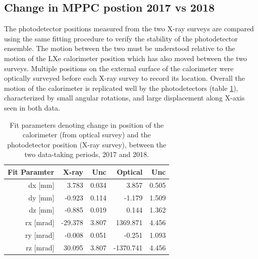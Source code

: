\subsection{Change in MPPC postion 2017 vs 2018}
The photodetector positions measured from the two X-ray surveys are
compared using the same fitting procedure to verify the stability 
of the photodetector ensemble.
The motion between the two
must be understood relative to the motion of the LXe calorimeter
position which has also moved between the two surveys.  Multiple
positions on the external surface of the calorimeter were optically
surveyed before each X-ray survey to record its location.  
Overall the motion of the calorimeter is replicated well 
by the photodetectors (table \ref{tab:xray2017vs2018}),
characterized by small angular rotations, and 
large displacement along X-axis seen in both data. 

\begin{table}[h] 
\centering
\begin{tabular}{rrrrr} 
Fit Paramter &  X-ray & Unc & 
Optical & Unc \\ 
\hline 
dx [mm]   &   3.783 & 0.034 &      3.857 &  0.505     \\ 
dy [mm]   &  -0.923 & 0.114 &     -1.179 &  1.509     \\ 
dz [mm]   &  -0.885 & 0.019 &      0.144 &  1.362     \\ 
rx [mrad] & -29.378 & 3.807 &   1369.871 &  4.456     \\ 
ry [mrad] &  -0.008 & 0.051 &     -0.251 &  1.093     \\ 
rz [mrad] &  30.095 & 3.807 &  -1370.741 &  4.456    

\end{tabular}
\caption{Fit parameters denoting change in position of the calorimeter
(from optical survey) and the photodetector position (X-ray survey),
between the two data-taking periods, 2017 and 2018.}
\label{tab:xray2017vs2018} \end{table}



